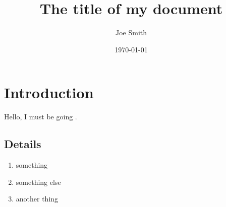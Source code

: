 \documentclass[10pt,letterpaper]{article}
\title{The title of my document}
\author{Joe Smith}
\date{\today}
\begin{document}
\maketitle

\lipsum[1]

\section{Introduction}

\lipsum[2]

Hello, I must be going \citep{Mattar:2005}.

\lipsum[3-4]

\subsection{Details}

\lipsum[5-7]

\begin{enumerate}
\item something
\item something else
\item another thing
\end{enumerate}

\lipsum[8-12]



\end{document}
